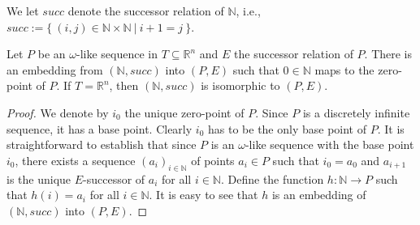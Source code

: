 \documentclass{LMCS}
\theoremstyle{plain}
\newcommand{\rsq}{\mathbb{R}^n}
\newcommand{\mi}{\mathit}
\begin{document}
%
We let $\mi{succ}$ denote the successor relation of $\mathbb{N}$, i.e.,
%
$\mi{succ}:=\{\ (i,j)\in\mathbb{N}\times\mathbb{N}\ |\ i+1 = j\ \}.$



%
\begin{lem}\label{nonstandardmodelsexcluded}
%
Let $P$ be an $\omega$-like sequence in $T\subseteq\rsq$ and $E$ the successor relation of $P$.
%
There is an embedding from $(\mathbb{N},\mi{succ})$ into $(P,E)$ such that $0\in\mathbb{N}$ maps to the zero-point of $P$.
%
If $T=\rsq$, then $(\mathbb{N},\mi{succ})$ is isomorphic to $(P,E)$.
%
\end{lem}
%
%
%
\begin{proof}
%
We denote by $i_0$ the unique zero-point of $P$.
%
Since $P$ is a discretely infinite sequence, it has a base point.
%
Clearly $i_0$ has to be the only base point of $P$.
% 
It is straightforward to establish that since $P$ is an $\omega$-like sequence with the base point $i_0$, there exists a sequence
%
 $(a_i)_{i\in \mathbb{N}}$ of points $a_i\in P$ such that $i_0=a_0$ and $a_{i+1}$ is the unique $E$-successor of $a_{i}$ for all $i\in \mathbb{N}$.
%
Define the function $h:\mathbb{N}\rightarrow P$ such that $h(i) = a_i$ for all $i\in\mathbb{N}$.
%
It is easy to see that $h$ is an embedding of $(\mathbb{N},\mi{succ})$ into $(P,E)$.
%



%

\end{proof}
\end{document}
